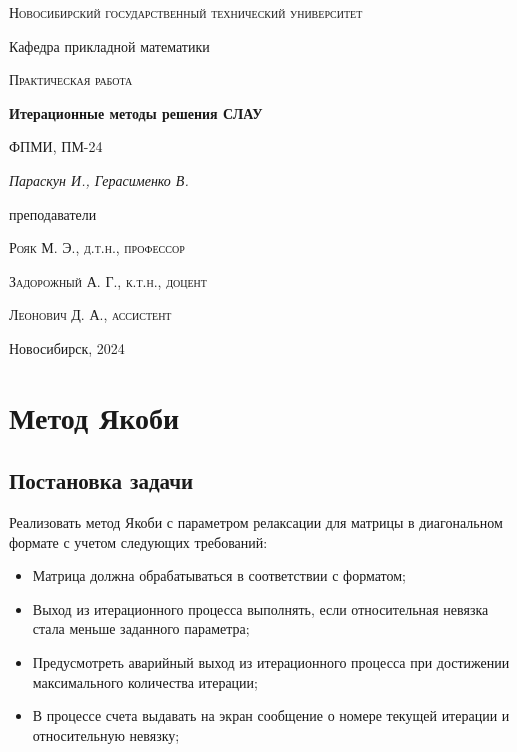 \documentclass[12pt, a4paper]{article}
\begin{document}
\begin{titlepage}
  \centering
  \textsc{Новосибирский государственный технический университет}\par
  \vspace{1mm}
  Кафедра прикладной математики\par
  \vspace{4cm}
  \textsc{Практическая работа }\par
  {\huge\bfseries Итерационные методы решения СЛАУ\par}
  \vspace{1cm}
  {\scriptsize ФПМИ, ПМ-24\par}
  \vspace{1mm}
  {\itshape\large Параскун И., Герасименко В.\par}
  \vfill
  {\small преподаватели\par}
  \vspace{2mm}
  \textsc{Рояк М. Э., д.т.н., профессор}\par
  \vspace{1mm}
  \textsc{Задорожный А. Г., к.т.н., доцент}\par
  \vspace{1mm}
  \textsc{Леонович Д. А., ассистент}\par
  \vfill
  \large{Новосибирск, 2024}
\end{titlepage}

\newpage

\setcounter{page}{2}
\tableofcontents

\newpage

\section{Метод Якоби}
\subsection{Постановка задачи}
Реализовать метод Якоби с параметром релаксации для матрицы в диагональном
формате с учетом следующих требований:

\begin{itemize}
  \item Матрица должна обрабатываться в соответствии с форматом;
  \item Выход из итерационного процесса выполнять, если относительная 
    невязка стала меньше заданного параметра;
  \item Предусмотреть аварийный выход из итерационного процесса при достижении 
    максимального количества итерации;
  \item В процессе счета выдавать на экран сообщение о номере текущей итерации 
    и относительную невязку;
\end{itemize}
\end{document}
